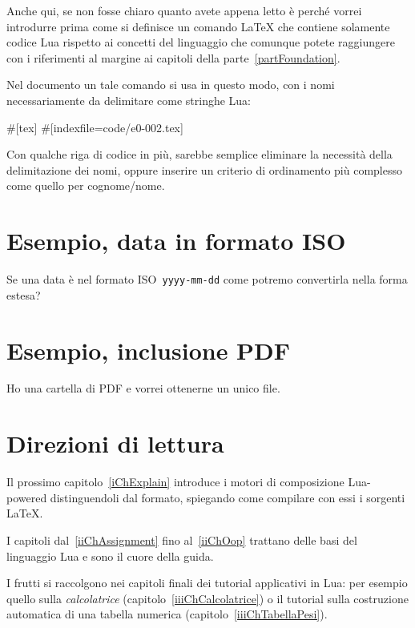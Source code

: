 Anche qui, se non fosse chiaro quanto avete appena letto è perché vorrei
introdurre prima come si definisce un comando \LaTeX{} che contiene solamente
codice Lua rispetto ai concetti del linguaggio che comunque potete raggiungere
con i riferimenti al margine ai capitoli della parte~\ref{partFoundation}.

Nel documento un tale comando si usa in questo modo, con i nomi necessariamente
da delimitare come stringhe Lua:
\begin{lines}
#[tex]
#[indexfile=code/e0-002.tex]
\end{lines}

Con qualche riga di codice in più, sarebbe semplice eliminare la necessità della
delimitazione dei nomi, oppure inserire un criterio di ordinamento più complesso
come quello per cognome/nome.


\section{Esempio, data in formato ISO}

Se una data è nel formato ISO~\texttt{yyyy-mm-dd} come potremo convertirla nella
forma estesa?


\section{Esempio, inclusione PDF}

Ho una cartella di PDF e vorrei ottenerne un unico file.


\section{Direzioni di lettura}

Il prossimo capitolo~\ref{iChExplain} introduce i motori di composizione
Lua-powered distinguendoli dal formato, spiegando come compilare con essi i
sorgenti \LaTeX{}.

I capitoli dal~\ref{iiChAssignment} fino al~\ref{iiChOop} trattano delle basi
del linguaggio Lua e sono il cuore della guida.


I frutti si raccolgono nei capitoli finali dei tutorial applicativi in Lua: per
esempio quello sulla \emph{calcolatrice} (capitolo~\ref{iiiChCalcolatrice}) o il
tutorial sulla costruzione automatica di una tabella numerica
(capitolo~\ref{iiiChTabellaPesi}).


